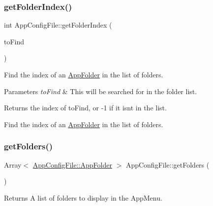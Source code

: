 \subsubsection{\texorpdfstring{get\+Folder\+Index()}{getFolderIndex()}}
{\footnotesize\ttfamily int App\+Config\+File\+::get\+Folder\+Index (\begin{DoxyParamCaption}\item[{\mbox{\hyperlink{structAppConfigFile_1_1AppFolder}{App\+Config\+File\+::\+App\+Folder}}}]{to\+Find }\end{DoxyParamCaption})}

Find the index of an \mbox{\hyperlink{structAppConfigFile_1_1AppFolder}{App\+Folder}} in the list of folders.


\begin{DoxyParams}{Parameters}
{\em to\+Find} & This will be searched for in the folder list.\\
\hline
\end{DoxyParams}
\begin{DoxyReturn}{Returns}
the index of to\+Find, or -\/1 if it isn\textquotesingle{}t in the list.
\end{DoxyReturn}
Find the index of an \mbox{\hyperlink{structAppConfigFile_1_1AppFolder}{App\+Folder}} in the list of folders. \mbox{\label{classAppConfigFile_a4e7df52156d7ae5c5c7e8abeb56609e7}} 
\subsubsection{\texorpdfstring{get\+Folders()}{getFolders()}}
{\footnotesize\ttfamily Array$<$ \mbox{\hyperlink{structAppConfigFile_1_1AppFolder}{App\+Config\+File\+::\+App\+Folder}} $>$ App\+Config\+File\+::get\+Folders (\begin{DoxyParamCaption}{ }\end{DoxyParamCaption})}

\begin{DoxyReturn}{Returns}
A list of folders to display in the App\+Menu. 
\end{DoxyReturn}
\mbox{\label{classAppConfigFile_a59fdc4888bb0575bb8c7c9a3de3e4876}} 
